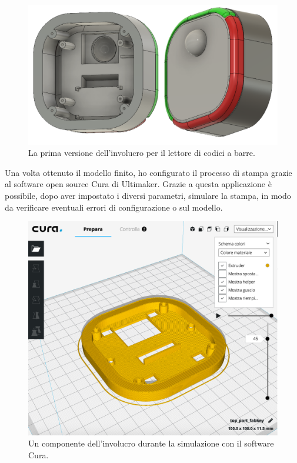 \begin{figure}[H]
	\begin{center}
	\includegraphics[scale=0.37]{immagini/render.png}
	\caption{La prima versione dell'involucro per il lettore di codici a barre.}
	\end{center}
\end{figure}

Una volta ottenuto il modello finito, ho configurato il processo di stampa grazie al software open source Cura di Ultimaker. Grazie a questa applicazione è possibile, dopo aver impostato i diversi parametri, simulare la stampa, in modo da verificare eventuali errori di configurazione o sul modello.

\begin{figure}[H]
	\begin{center}
	\includegraphics[scale=0.37]{immagini/simulatore_stampa.png}
	\caption{Un componente dell'involucro durante la simulazione con il software Cura.}
	\end{center}
\end{figure}

